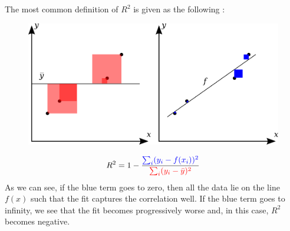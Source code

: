 \documentclass[]{article}
\begin{document}
The most common definition of $R^2$ is given as the following \cite{correlation_coefficient}:
\begin{figure}[H]
	\begin{center}
		\includegraphics[width=\columnwidth]{./figures/CoD.png}
	\end{center}
\end{figure}
\begin{equation*}
	R^2 = 1 - \frac{\color{blue}{\sum_i (y_i - f(x_i))^2}}{\color{red}{\sum_i (y_i - \bar{y})^2}}
\end{equation*}
As we can see, if the blue term goes to zero, then all the data lie on the line $f(x)$ such that the fit captures the correlation well.
If the blue term goes to infinity, we see that the fit becomes progressively worse and, in this case, $R^2$ becomes negative.
\end{document}
